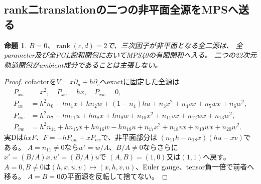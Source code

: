 \documentclass[a4paper,11pt]{ltjsarticle}
\newtheorem{proposition}{命題}[section]
\theoremstyle{definition}
\begin{document}
\subsection{rank二translationの二つの非平面全源をMPSへ送る}
\begin{proposition}\label{prop:two-hyperplanes-translation-nonplane-all-MPS}
$B=0$、$\operatorname{rank}(c,d)=2$で、三次因子が非平面となる全二源は、
全parameter及び全PGL飽和閉包においてMPS40の有限閉和へ入る。
二つの22次元軌道閉包がambient成分であることは主張しない。
\end{proposition}
\begin{proof}
cofactorを$V=x\partial_u+h\partial_v$へexactに固定した全源は
\[
\begin{split}
 P_{xu}&=x^2,\quad P_{xv}=hx,\quad P_{xw}=0,\\
 P_{uv}&=h^2n_0+hn_1x+hn_2w+(1-n_4)hu+n_3x^2+n_4vx+n_5wx+n_6w^2,\\
 P_{uw}&=h^2n_7-hn_{11}u+hn_8x+hn_9w+n_{10}x^2+n_{11}vx+n_{12}wx+n_{13}w^2,\\
 P_{vw}&=h^2n_{14}+hn_{15}x+hn_{16}w-hn_{18}u+n_{17}x^2+n_{18}vx+n_{19}wx+n_{20}w^2.
\end{split}
\]
実Dは$hxF$、$F=-hP_{uw}+xP_{vw}$で、非平面部分は
$(n_{11}h-n_{18}x)(hu-xv)$である。
$A=n_{11}\ne0$なら$w'=w/A$、$B/A\ne0$ならさらに$x'=(B/A)x,u'=(B/A)u$で
$(A,B)=(1,0)$又は$(1,1)$へ戻す。
$A=0,B\ne0$は$(h,x,u,v)\mapsto(x,h,v,u)$、Euler gauge、tensor負一倍で前者へ移る。
$A=B=0$の平面源を反転して捨てない。


\end{proof}
\end{document}
